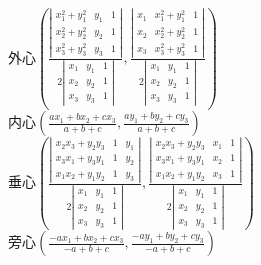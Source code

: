 \begin{itemize}
\begin{itemize}
					\\外心$ \left(\frac{\left|\begin{array}{cccc}
							x_1^2 + y_1^2 & y_1 & 1\\
							x_2^2 + y_2^2 & y_2 & 1\\
							x_3^2 + y_3^2 & y_3 & 1
						\end{array}\right|}{2 \left|\begin{array}{cccc}
							x_1 & y_1 & 1\\
							x_2 & y_2 & 1\\
							x_3 & y_3 & 1
						\end{array}\right|}, \frac{\left|\begin{array}{cccc}
							x_1 & x_1^2 + y_1^2 & 1\\
							x_2 & x_2^2 + y_2^2 & 1\\
							x_3 & x_3^2 + y_3^2 & 1
						\end{array}\right|}{2\left|\begin{array}{cccc}
							x_1 & y_1 & 1\\
							x_2 & y_2 & 1\\
							x_3 & y_3 & 1
						\end{array}\right|}\right) $
					\\内心$ \left(\frac{a x_1 + b x_2 + c x_3}{a + b + c}, \frac{a y_1 + b y_2 + c y_3}{a + b + c}\right) $
					\\垂心$ \left(\frac{\left|\begin{array}{cccc}
						x_2 x_3 + y_2 y_3 & 1 & y_1\\
						x_3 x_1 + y_3 y_1 & 1 & y_2\\
						x_1 x_2 + y_1 y_2 & 1 & y_3
						\end{array}\right|}{2 \left|\begin{array}{cccc}
						x_1 & y_1 & 1\\
						x_2 & y_2 & 1\\
						x_3 & y_3 & 1
						\end{array}\right|}, \frac{\left|\begin{array}{cccc}
						x_2 x_3 + y_2 y_3 & x_1 & 1\\
						x_3 x_1 + y_3 y_1 & x_2 & 1\\
						x_1 x_2 + y_1 y_2 & x_3 & 1
						\end{array}\right|}{2\left|\begin{array}{cccc}
						x_1 & y_1 & 1\\
						x_2 & y_2 & 1\\
						x_3 & y_3 & 1
						\end{array}\right|}\right) $
					\\旁心$ \left(\frac{- a x_1 + b x_2 + c x_3}{- a + b + c}, \frac{- a y_1 + b y_2 + c y_3}{- a + b + c}\right) $
			\end{itemize}
	\end{itemize}
